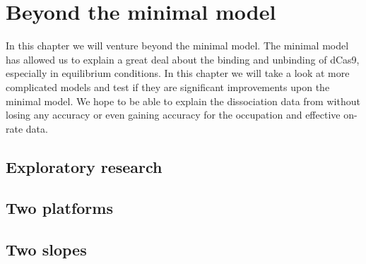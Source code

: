 \chapter{Beyond the minimal model}
In this chapter we will venture beyond the minimal model. The minimal model has allowed us to explain a great deal about the binding and unbinding of dCas9, especially in equilibrium conditions. In this chapter we will take a look at more complicated models and test if they are significant improvements upon the minimal model. We hope to be able to explain the dissociation data from \cite{PNAS} without losing any accuracy or even gaining accuracy for the occupation and effective on-rate data.


\section{Exploratory research}



\section{Two platforms}



\section{Two slopes}
